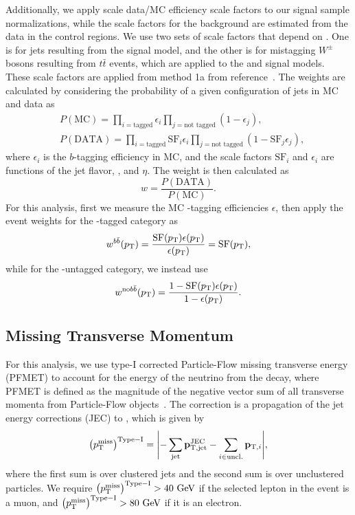 Additionally, we apply scale data/MC efficiency scale factors to our signal sample normalizations, while the scale factors for the background are estimated from the data in the control regions.
We use two sets of scale factors that depend on \ptjet.
One is for \Htobbbar jets resulting from the \WprtoWHtolnubbbar signal model, and the other is for mistagging $W^\pm$ bosons resulting from $t\bar{t}$ events, which are applied to the \GBulktoWWtolnuqqbarpr and \WprtoWZtolnuqqbar signal models.
These scale factors are applied from method 1a from reference~\cite{bTaggingEff}.
The weights are calculated by considering the probability of a given configuration of jets in MC and data as
\begin{align}
  & P(\mathrm{MC})=\prod_{i=\text{tagged}}\epsilon_i\prod_{j=\text{not tagged}}(1-\epsilon_j),\\
  & P(\mathrm{DATA})=\prod_{i=\text{tagged}}\mathrm{SF}_i\epsilon_i\prod_{j=\text{not tagged}}(1-\mathrm{SF}_j\epsilon_j),
\end{align}
where $\epsilon_i$ is the $b$-tagging efficiency in MC, and the scale factors $\mathrm{SF}_i$ and $\epsilon_i$ are functions of the jet flavor, \pt, and $\eta$.
The weight is then calculated as
\begin{equation}
  w=\frac{P(\mathrm{DATA})}{P(\mathrm{MC})}.
\end{equation}
For this analysis, first we measure the MC \bbbar-tagging efficiencies $\epsilon$, then apply the event weights for the \bbbar-tagged category as
\begin{equation}
  w^{b\bar{b}}(p_\mathrm{T})=\frac{\mathrm{SF}(p_\mathrm{T})\epsilon(p_\mathrm{T})}{\epsilon(p_\mathrm{T})}=\mathrm{SF}(p_\mathrm{T}),
\end{equation}
while for the \bbbar-untagged category, we instead use
\begin{equation}
  w^{\mathrm{no}b\bar{b}}(p_\mathrm{T})=\frac{1-\mathrm{SF}(p_\mathrm{T})\epsilon(p_\mathrm{T})}{1-\epsilon(p_\mathrm{T})}.
\end{equation}

\subsection{Missing Transverse Momentum}

For this analysis, we use type-I corrected Particle-Flow missing transverse energy (PFMET) to account for the energy of the neutrino from the \Wlep decay, where PFMET is defined as the magnitude of the negative vector sum of all transverse momenta from Particle-Flow objects~\cite{Sirunyan:2019kia}.
The correction is a propagation of the jet energy corrections (JEC) to \ptmiss, which is given by
\begin{equation}
  \ptmissTI=\vqty{-\sum_\mathrm{jet}\vb{p}_\mathrm{T,jet}^\mathrm{JEC}-\sum_{i\in\mathrm{uncl.}}\vb{p}_{\mathrm{T},i}},
\end{equation}
where the first sum is over clustered jets and the second sum is over unclustered particles.
We require $\ptmissTI>40\unit{GeV}$ if the selected lepton in the event is a muon, and $\ptmissTI>80\unit{GeV}$ if it is an electron.

